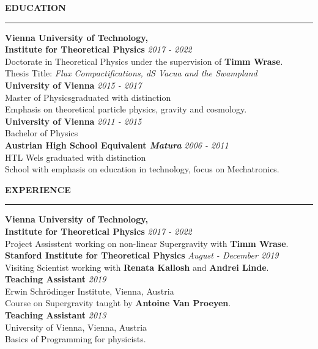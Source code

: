 \documentclass[a4paper,12pt,twoside,openright]{report}
\newenvironment{rSection}[1]{ %
  \sectionskip
  \MakeUppercase{\bf #1} %
  \sectionlineskip
  \hrule %
  \begin{list}{}{ %
    \setlength{\leftmargin}{1.5em} %
  }
  \item[]
}{
  \end{list}
}
\def\sectionlineskip{\medskip} %
\def\sectionskip{\medskip} %
\begin{document}
\begin{rSection}{Education}
     \vspace{7pt}
 {\bf Vienna University of Technology,}\\{\bf Institute for Theoretical Physics} \hfill {\em 2017 - 2022} 
 \\ Doctorate in Theoretical Physics under the supervision of {\bf Timm Wrase}.
 \\ Thesis Title: \emph{Flux Compactifications, dS Vacua and the Swampland}\vspace{7pt}
 \\{\bf University of Vienna} \hfill {\em 2015 - 2017} 
 \\ Master of Physics\hfill {graduated with distinction }
 \\ Emphasis on theoretical particle physics, gravity and cosmology.\vspace{7pt}
 \\ {\bf University of Vienna} \hfill {\em 2011 - 2015}
 \\ Bachelor of Physics \vspace{7pt}
 \\ {\bf Austrian High School Equivalent \emph{Matura}} \hfill {\em 2006 - 2011}
 \\ HTL Wels \hfill {graduated with distinction}
 \\ School with emphasis on education in technology, focus on Mechatronics.
 
 \end{rSection}
 
 
 \begin{rSection}{Experience}
     \vspace{7pt}
 {\bf Vienna University of Technology,}\\{\bf Institute for Theoretical Physics} \hfill {\em 2017 - 2022} 
 \\ Project Assisstent working on non-linear Supergravity with {\bf Timm Wrase}.
 \vspace{7pt}
 \\{\bf Stanford Institute for Theoretical Physics} \hfill {\em August - December 2019}
 \\ Visiting Scientist working with {\bf Renata Kallosh} and {\bf Andrei Linde}.
 \vspace{7pt}
 \\{\bf Teaching Assistant} \hfill {\em 2019}
 \\ Erwin Schrödinger Institute, Vienna, Austria
 \\ Course on Supergravity taught by {\bf Antoine Van Proeyen}.\vspace{7pt}
 \\{\bf Teaching Assistant} \hfill {\em 2013}
 \\ University of Vienna, Vienna, Austria
 \\ Basics of Programming for physicists.
 
 \end{rSection}
            
\end{document}
